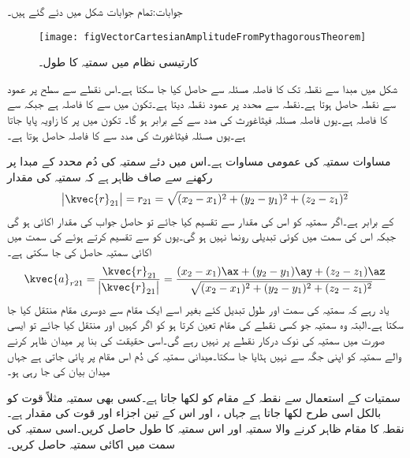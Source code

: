 جوابات:تمام جوابات شکل میں دئے گئے ہیں۔
\begin{figure}
\centering
\texttt{[image: figVectorCartesianAmplitudeFromPythagorousTheorem]}
\caption{کارتیسی نظام میں سمتیہ کا طول۔}
\label{شکل_سمتیہ_کارتیسی_سمتیہ_طول}
\end{figure}

شکل  میں مبدا سے نقطہ  تک کا فاصلہ  مسئلہ  سے حاصل کیا جا سکتا ہے۔اس نقطے سے  سطح پر عمود سے نقطہ  حاصل ہوتا ہے۔نقطہ  سے  محدد پر عمود نقطہ  دیتا ہے۔تکون  میں  سے  کا فاصلہ  ہے جبکہ  سے  کا فاصلہ  ہے۔یوں فاصلہ  مسئلہ فیثاغورث کی مدد سے   کے برابر ہو گا۔ تکون  میں  پر  کا زاویہ پایا جاتا ہے۔یوں مسئلہ فیثاغورث کی مدد سے  کا فاصلہ  حاصل ہوتا ہے۔

مساوات  سمتیہ کی عمومی مساوات ہے۔اس میں دئے سمتیہ  کی دُم محدد کے مبدا پر رکھنے سے صاف ظاہر ہے کہ سمتیہ کی مقدار
\begin{align}
\abs{\kvec{r}_{21}}=r_{21}=\sqrt{(x_2-x_1)^2+(y_2-y_1)^2+(z_2-z_1)^2}
\end{align}
کے برابر ہے۔اگر سمتیہ کو اس کی مقدار سے تقسیم کیا جائے تو حاصل جواب کی مقدار اکائی ہو گی جبکہ اس کی سمت میں کوئی تبدیلی رونما نہیں ہو گی۔یوں   کو  سے تقسیم کرتے ہوئے  کی سمت میں اکائی سمتیہ  حاصل کی جا سکتی ہے۔
\begin{align}
\kvec{a}_{r21}=\frac{\kvec{r}_{21}}{\abs{\kvec{r}_{21}}}=\frac{(x_2-x_1) \ax+(y_2-y_1)\ay+(z_2-z_1)\az}{\sqrt{(x_2-x_1)^2+(y_2-y_1)^2+(z_2-z_1)^2}}
\end{align}
یاد رہے کہ سمتیہ کی سمت اور طول تبدیل کئے بغیر اسے ایک مقام سے دوسری مقام منتقل کیا جا سکتا ہے۔البتہ وہ سمتیہ جو کسی نقطے کی مقام تعین کرتا ہو کو اگر کہیں اور منتقل کیا جائے تو ایسی صورت میں  سمتیہ کی نوک درکار نقطے پر نہیں رہے گی۔اسی حقیقت کی بنا پر میدان ظاہر کرنے والے سمتیہ کو اپنی جگہ سے نہیں ہٹایا جا سکتا۔میدانی سمتیہ کی دُم اس مقام پر پائی جاتی ہے جہاں میدان بیان کی جا رہی ہو۔  

سمتیات کے استعمال سے نقطہ  کے مقام کو  لکھا جاتا ہے۔کسی بھی سمتیہ مثلاً قوت  کو بالکل اسی طرح   لکھا جاتا ہے جہاں ،  اور  اس کے تین اجزاء اور
   قوت کی مقدار ہے۔
نقطہ   کا مقام ظاہر کرنے والا سمتیہ اور اس سمتیہ کا طول حاصل کریں۔اسی سمتیہ کی سمت میں اکائی سمتیہ حاصل کریں۔

